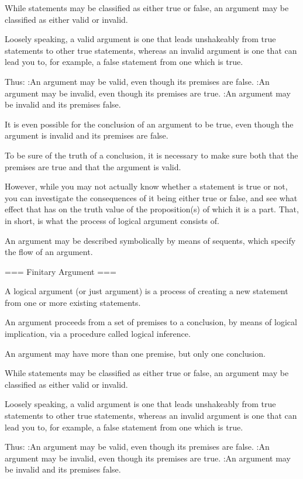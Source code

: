 While statements may be classified as either true or false, an argument may be classified as either valid or invalid.


Loosely speaking, a valid argument is one that leads unshakeably from true statements to other true statements, whereas an invalid argument is one that can lead you to, for example, a false statement from one which is true.


Thus:
:An argument may be valid, even though its premises are false.
:An argument may be invalid, even though its premises are true.
:An argument may be invalid and its premises false.

It is even possible for the conclusion of an argument to be true, even though the argument is invalid and its premises are false.


To be sure of the truth of a conclusion, it is necessary to make sure both that the premises are true and that the argument is valid.


However, while you may not actually know whether a statement is true or not, you can investigate the consequences of it being either true or false, and see what effect that has on the truth value of the proposition(s) of which it is a part. That, in short, is what the process of logical argument consists of.


An argument may be described symbolically by means of sequents, which specify the flow of an argument.


=== Finitary Argument ===

A logical argument (or just argument) is a process of creating a new statement from one or more existing statements.

An argument proceeds from a set of premises to a conclusion, by means of logical implication, via a procedure called logical inference.


An argument may have more than one premise, but only one conclusion.


While statements may be classified as either true or false, an argument may be classified as either valid or invalid.


Loosely speaking, a valid argument is one that leads unshakeably from true statements to other true statements, whereas an invalid argument is one that can lead you to, for example, a false statement from one which is true.


Thus:
:An argument may be valid, even though its premises are false.
:An argument may be invalid, even though its premises are true.
:An argument may be invalid and its premises false.

